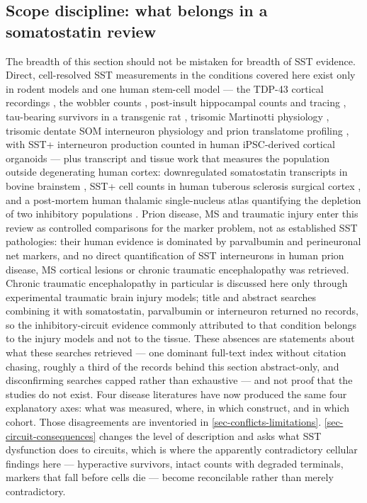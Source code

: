 \documentclass[11pt]{article}
\begin{document}
\subsection{Scope discipline: what belongs in a somatostatin review}
\label{sec-07-scope-discipline}

The breadth of this section should not be mistaken for breadth of SST evidence. Direct, cell-resolved SST measurements in the conditions covered here exist only in rodent models and one human stem-cell model --- the TDP-43 cortical recordings \citep{Zhang2016}, the wobbler counts \citep{NietoGonzalez2010}, post-insult hippocampal counts and tracing \citep{Mishra2015,Frankowski2022,Levenga2013,Drake2024}, tau-bearing survivors in a transgenic rat \citep{Morrone2022}, trisomic Martinotti physiology \citep{ZorrillaDeSanMartin2020}, trisomic dentate SOM interneuron physiology \citep{Gutmann2026} and prion translatome profiling \citep{Bauer2022a}, with SST+ interneuron production counted in human iPSC-derived cortical organoids \citep{Zhu2026} --- plus transcript and tissue work that measures the population outside degenerating human cortex: downregulated somatostatin transcripts in bovine brainstem \citep{Krull2025}, SST+ cell counts in human tuberous sclerosis surgical cortex \citep{Scheper2024}, and a post-mortem human thalamic single-nucleus atlas quantifying the depletion of two inhibitory populations \citep{Trujillo2026}. Prion disease, MS and traumatic injury enter this review as controlled comparisons for the marker problem, not as established SST pathologies: their human evidence is dominated by parvalbumin and perineuronal net markers, and no direct quantification of SST interneurons in human prion disease, MS cortical lesions or chronic traumatic encephalopathy was retrieved. Chronic traumatic encephalopathy in particular is discussed here only through experimental traumatic brain injury models; title and abstract searches combining it with somatostatin, parvalbumin or interneuron returned no records, so the inhibitory-circuit evidence commonly attributed to that condition belongs to the injury models and not to the tissue. These absences are statements about what these searches retrieved --- one dominant full-text index without citation chasing, roughly a third of the records behind this section abstract-only, and disconfirming searches capped rather than exhaustive --- and not proof that the studies do not exist. Four disease literatures have now produced the same four explanatory axes: what was measured, where, in which construct, and in which cohort. Those disagreements are inventoried in \ref{sec-conflicts-limitations}. \ref{sec-circuit-consequences} changes the level of description and asks what SST dysfunction does to circuits, which is where the apparently contradictory cellular findings here --- hyperactive survivors, intact counts with degraded terminals, markers that fall before cells die --- become reconcilable rather than merely contradictory.
\end{document}
